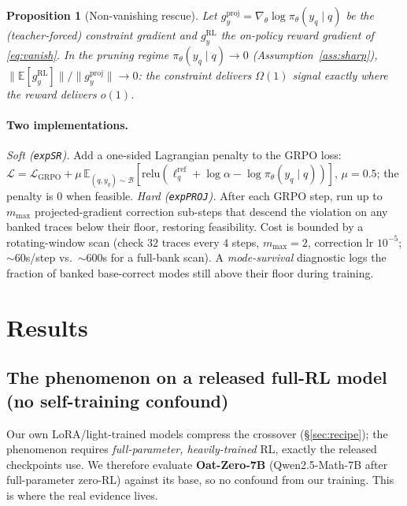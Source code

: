 \documentclass[11pt]{article}
\newtheorem{proposition}{Proposition}
\theoremstyle{definition}
\begin{document}
\begin{proposition}[Non-vanishing rescue]\label{prop:rescue}
Let $g^{\mathrm{proj}}_y=\nabla_\theta\log\pi_\theta(y_q\mid q)$ be the (teacher-forced) constraint
gradient and $g^{\mathrm{RL}}_y$ the on-policy reward gradient of \eqref{eq:vanish}. In the pruning
regime $\pi_\theta(y_q\mid q)\to0$ (Assumption~\ref{ass:sharp}),
$\lVert\mathbb{E}[g^{\mathrm{RL}}_y]\rVert / \lVert g^{\mathrm{proj}}_y\rVert \to 0$: the constraint
delivers $\Omega(1)$ signal exactly where the reward delivers $o(1)$.
\end{proposition}

\paragraph{Two implementations.}
\emph{Soft (\texttt{expSR}).} Add a one-sided Lagrangian penalty to the GRPO loss:
$\mathcal{L}=\mathcal{L}_{\mathrm{GRPO}}+\mu\,\mathbb{E}_{(q,y_q)\sim\mathcal{B}}
[\mathrm{relu}(\ell^{\mathrm{ref}}_q+\log\alpha-\log\pi_\theta(y_q\mid q))]$, $\mu{=}0.5$; the penalty
is $0$ when feasible.
\emph{Hard (\texttt{expPROJ}).} After each GRPO step, run up to $m_{\max}$ projected-gradient
correction sub-steps that descend the violation on any banked traces below their floor, restoring
feasibility. Cost is bounded by a rotating-window scan (check $32$ traces every $4$ steps,
$m_{\max}{=}2$, correction lr $10^{-5}$; $\sim$60s/step vs.\ $\sim$600s for a full-bank scan).
A \emph{mode-survival} diagnostic logs the fraction of banked base-correct modes still above their
floor during training.

\section{Results}
\label{sec:results}

\subsection{The phenomenon on a released full-RL model (no self-training confound)}
Our own LoRA/light-trained models compress the crossover (\S\ref{sec:recipe}); the phenomenon
requires \emph{full-parameter, heavily-trained} RL, exactly the released checkpoints
\citet{yue2025} use. We therefore evaluate \textbf{Oat-Zero-7B} (Qwen2.5-Math-7B after full-parameter
zero-RL) against its base, so no confound from our training. This is where the real evidence lives.
\end{document}
